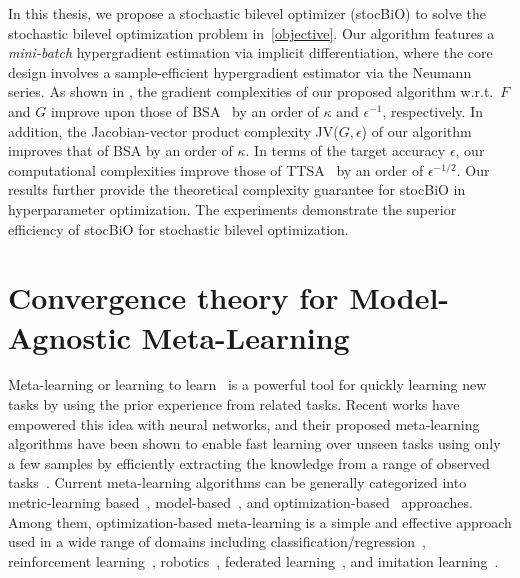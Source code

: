 \documentclass{osudissert96}
\begin{document}
\vspace{0.2cm}
 In this thesis, we propose a stochastic bilevel optimizer (stocBiO) to solve the stochastic bilevel optimization problem in~\cref{objective}. Our algorithm features a {\em mini-batch} hypergradient estimation via implicit differentiation,  where the core design involves %
 a sample-efficient hypergradient estimator via the Neumann series. 
As shown in , the gradient complexities of our proposed algorithm w.r.t.~$F$  and $G$  improve upon those of BSA~\cite{ghadimi2018approximation} by an order of $\kappa$ and $\epsilon^{-1}$, respectively. In addition, the Jacobian-vector product complexity JV($G,\epsilon$) of our algorithm improves that of BSA by an order of $\kappa$. In terms of the target accuracy $\epsilon$, our computational complexities  improve those of TTSA~\cite{hong2020two} by an order of $\epsilon^{-1/2}$. Our results further provide the theoretical complexity guarantee for stocBiO in hyperparameter optimization. The experiments demonstrate the superior efficiency of stocBiO for stochastic bilevel optimization.  


\section{Convergence theory for Model-Agnostic Meta-Learning}
Meta-learning or learning to learn~\cite{thrun2012learning,naik1992meta,bengio1991learning,schmidhuber1987evolutionary} is a powerful tool  for  quickly learning new tasks by using the prior experience from  related tasks. Recent works have empowered this idea with neural networks, and their proposed meta-learning algorithms have been shown to enable fast learning over unseen tasks using only a few samples 
by efficiently extracting the knowledge from a range of observed tasks~\cite{santoro2016meta,vinyals2016matching,finn2017model}.  Current meta-learning algorithms can be generally categorized into metric-learning based~\cite{koch2015siamese,snell2017prototypical},  model-based~\cite{vinyals2016matching,munkhdalai2017meta}, and optimization-based~\cite{finn2017model,nichol2018reptile,rajeswaran2019meta} approaches. Among them, optimization-based meta-learning is  a  simple and effective approach used in a wide range of domains including classification/regression~\cite{rajeswaran2019meta}, reinforcement learning~\cite{finn2017model}, robotics~\cite{al2018continuous}, federated learning~\cite{chen2018federated}, and imitation learning~\cite{finn2017one}.
\end{document}
